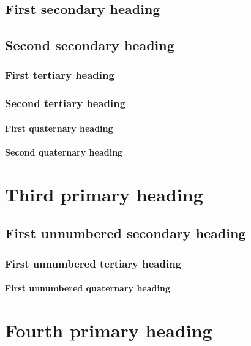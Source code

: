 \documentclass[12pt]{article}
\begin{document}
\subsection{First secondary heading}

\subsection{Second secondary heading}

\subsubsection{First tertiary heading}

\subsubsection{Second tertiary heading}

\paragraph{First quaternary heading}

\paragraph{Second quaternary heading}

\section{Third primary heading}

\subsection*{First unnumbered secondary heading}

\subsubsection*{First unnumbered tertiary heading}

\paragraph*{First unnumbered quaternary heading}

\section{Fourth primary heading}
\end{document}
